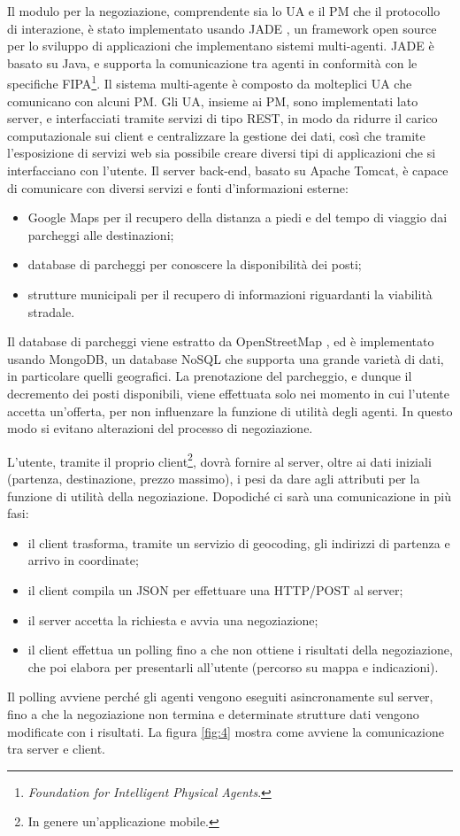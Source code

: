 \documentclass[11pt,a4paper,twoside]{article}
\numberwithin{figure}{section}
\numberwithin{equation}{section}
\begin{document}
Il modulo per la negoziazione, comprendente sia lo UA e il PM che il protocollo di interazione, è stato implementato usando JADE \cite{11}, un framework open source per lo sviluppo di applicazioni che implementano sistemi multi-agenti. JADE è basato su Java, e supporta la comunicazione tra agenti in conformità con le specifiche FIPA\footnote{\emph{Foundation for Intelligent Physical Agents}.}. Il sistema multi-agente è composto da molteplici UA che comunicano con alcuni PM. Gli UA, insieme ai PM, sono implementati lato server, e interfacciati tramite servizi di tipo REST, in modo da ridurre il carico computazionale sui client e centralizzare la gestione dei dati, così che tramite l'esposizione di servizi web sia possibile creare diversi tipi di applicazioni che si interfacciano con l'utente. Il server back-end, basato su Apache Tomcat, è capace di comunicare con diversi servizi e fonti d'informazioni esterne:
\begin{itemize}
    \item Google Maps \cite{12} per il recupero della distanza a piedi e del tempo di viaggio dai parcheggi alle destinazioni;
    \item database di parcheggi per conoscere la disponibilità dei posti;
    \item strutture municipali per il recupero di informazioni riguardanti la viabilità stradale.
\end{itemize}
Il database di parcheggi viene estratto da OpenStreetMap \cite{13}, ed è implementato usando MongoDB, un database NoSQL che supporta una grande varietà di dati, in particolare quelli geografici.
La prenotazione del parcheggio, e dunque il decremento dei posti disponibili, viene effettuata solo nei momento in cui l'utente accetta un'offerta, per non influenzare la funzione di utilità degli agenti. In questo modo si evitano alterazioni del processo di negoziazione.

L'utente, tramite il proprio client\footnote{In genere un'applicazione mobile.}, dovrà fornire al server, oltre ai dati iniziali (partenza, destinazione, prezzo massimo), i pesi da dare agli attributi per la funzione di utilità della negoziazione.
Dopodiché ci sarà una comunicazione in più fasi:
\begin{itemize}
    \item il client trasforma, tramite un servizio di geocoding, gli indirizzi di partenza e arrivo in coordinate;
    \item il client compila un JSON per effettuare una HTTP/POST al server;
    \item il server accetta la richiesta e avvia una negoziazione;
    \item il client effettua un polling fino a che non ottiene i risultati della negoziazione, che poi elabora per presentarli all'utente (percorso su mappa e indicazioni).
\end{itemize}
Il polling avviene perché gli agenti vengono eseguiti asincronamente sul server, fino a che la negoziazione non termina e determinate strutture dati vengono modificate con i risultati.
La figura \ref{fig:4} mostra come avviene la comunicazione tra server e client.
\end{document}
